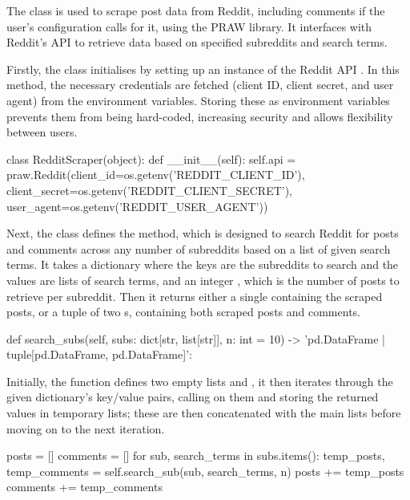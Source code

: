 The  class is used to scrape post data from Reddit, including comments if the user's configuration calls for it, using the PRAW library. It interfaces with Reddit's API to retrieve data based on specified subreddits and search terms.

Firstly, the class initialises by setting up an instance of the Reddit API . In this method, the necessary credentials are fetched (client ID, client secret, and user agent) from the environment variables. Storing these as environment variables prevents them from being hard-coded, increasing security and allows flexibility between users.

\begin{python}
class RedditScraper(object):
    def __init__(self):
            self.api = praw.Reddit(client_id=os.getenv('REDDIT_CLIENT_ID'), client_secret=os.getenv('REDDIT_CLIENT_SECRET'), user_agent=os.getenv('REDDIT_USER_AGENT'))
\end{python}

Next, the class defines the  method, which is designed to search Reddit for posts and comments across any number of subreddits based on a list of given search terms. It takes a dictionary  where the keys are the subreddits to search and the values are lists of search terms, and an integer , which is the number of posts to retrieve per subreddit. Then it returns either a single  containing the scraped posts, or a tuple of two s, containing both scraped posts and comments.

\begin{python}
def search_subs(self, subs: dict[str, list[str]], n: int = 10) -> 'pd.DataFrame | tuple[pd.DataFrame, pd.DataFrame]':
\end{python}

Initially, the function defines two empty lists  and , it then iterates through the given dictionary's key/value pairs, calling  on them and storing the returned values in temporary lists; these are then concatenated with the main lists before moving on to the next iteration.

\begin{python}
posts = []
comments = []
for sub, search_terms in subs.items():
    temp_posts, temp_comments = self.search_sub(sub, search_terms, n)
    posts += temp_posts
    comments += temp_comments
\end{python}


